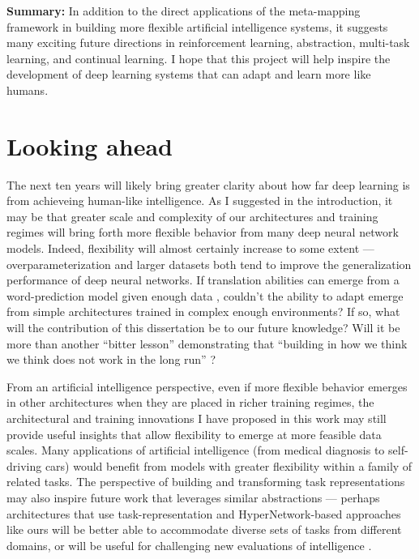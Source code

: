 \textbf{Summary:} In addition to the direct applications of the meta-mapping framework in building more flexible artificial intelligence systems, it suggests many exciting future directions in reinforcement learning, abstraction, multi-task learning, and continual learning. I hope that this project will help inspire the development of deep learning systems that can adapt and learn more like humans. \par 

\section{Looking ahead}

The next ten years will likely bring greater clarity about how far deep learning is from achieveing human-like intelligence. As I suggested in the introduction, it may be that greater scale and complexity of our architectures and training regimes will bring forth more flexible behavior from many deep neural network models. Indeed, flexibility will almost certainly increase to some extent --- overparameterization and larger datasets both tend to improve the generalization performance of deep neural networks. If translation abilities can emerge from a word-prediction model given enough data \citep{Radford2019}, couldn't the ability to adapt emerge from simple architectures trained in complex enough environments? If so, what will the contribution of this dissertation be to our future knowledge? Will it be more than another ``bitter lesson'' demonstrating that ``building in how we think we think does not work in the long run'' \citep{Sutton2019}? \par 

From an artificial intelligence perspective, even if more flexible behavior emerges in other architectures when they are placed in richer training regimes, the architectural and training innovations I have proposed in this work may still provide useful insights that allow flexibility to emerge at more feasible data scales. Many applications of artificial intelligence (from medical diagnosis to self-driving cars) would benefit from models with greater flexibility within a family of related tasks. The perspective of building and transforming task representations may also inspire future work that leverages similar abstractions --- perhaps architectures that use task-representation and HyperNetwork-based approaches like ours will be better able to accommodate diverse sets of tasks from different domains, or will be useful for challenging new evaluations of intelligence \citep[e.g.][]{Chollet2019}. \par 

